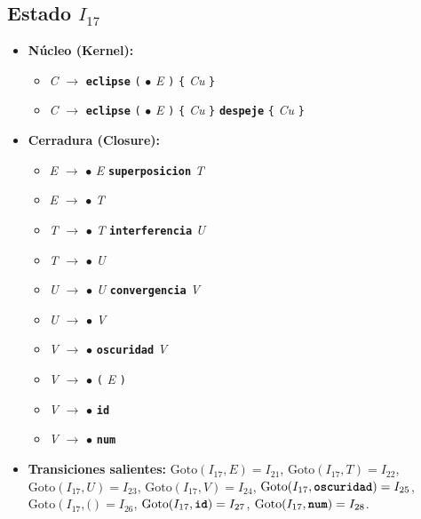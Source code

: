 \documentclass[12pt, letterpaper]{article}
\begin{document}
\subsection*{Estado $I_{17}$ }
\begin{itemize}\setlength{\itemsep}{1pt}\setlength{\parskip}{0pt}
\item \textbf{Núcleo (Kernel):}
\begin{itemize}\setlength{\itemsep}{1pt}\setlength{\parskip}{0pt}
    \item \textit{C} $\to$ \textbf{\texttt{eclipse}} \texttt{(} $\bullet$ \textit{E} \texttt{)} \texttt{\{} \textit{Cu} \texttt{\}}
    \item \textit{C} $\to$ \textbf{\texttt{eclipse}} \texttt{(} $\bullet$ \textit{E} \texttt{)} \texttt{\{} \textit{Cu} \texttt{\}} \textbf{\texttt{despeje}} \texttt{\{} \textit{Cu} \texttt{\}}
\end{itemize}
\item \textbf{Cerradura (Closure):}
\begin{itemize}\setlength{\itemsep}{1pt}\setlength{\parskip}{0pt}
    \item \textit{E} $\to$ $\bullet$ \textit{E} \textbf{\texttt{superposicion}} \textit{T}
    \item \textit{E} $\to$ $\bullet$ \textit{T}
    \item \textit{T} $\to$ $\bullet$ \textit{T} \textbf{\texttt{interferencia}} \textit{U}
    \item \textit{T} $\to$ $\bullet$ \textit{U}
    \item \textit{U} $\to$ $\bullet$ \textit{U} \textbf{\texttt{convergencia}} \textit{V}
    \item \textit{U} $\to$ $\bullet$ \textit{V}
    \item \textit{V} $\to$ $\bullet$ \textbf{\texttt{oscuridad}} \textit{V}
    \item \textit{V} $\to$ $\bullet$ \texttt{(} \textit{E} \texttt{)}
    \item \textit{V} $\to$ $\bullet$ \textbf{\texttt{id}}
    \item \textit{V} $\to$ $\bullet$ \textbf{\texttt{num}}
\end{itemize}
\item \textbf{Transiciones salientes:} $\text{Goto}(I_{17}, \textit{E}) = I_{21}$, \quad $\text{Goto}(I_{17}, \textit{T}) = I_{22}$, \quad $\text{Goto}(I_{17}, \textit{U}) = I_{23}$, \quad $\text{Goto}(I_{17}, \textit{V}) = I_{24}$, \quad $\text{Goto}(I_{17}, \textbf{\texttt{oscuridad}}) = I_{25}$, \quad $\text{Goto}(I_{17}, \texttt{(}) = I_{26}$, \quad $\text{Goto}(I_{17}, \textbf{\texttt{id}}) = I_{27}$, \quad $\text{Goto}(I_{17}, \textbf{\texttt{num}}) = I_{28}$.
\end{itemize}
\vspace{2pt}
\end{document}

